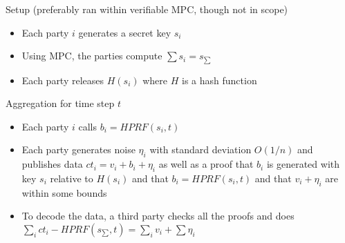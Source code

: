 \documentclass[11pt]{article}
\begin{document}
\begin{mdframed}
	Setup (preferably ran within verifiable MPC, though not in scope) \begin{itemize}
		\item Each party $i$ generates a secret key $s_i$
		\item Using MPC, the parties compute $\sum s_i = s_{\sum}$
		\item Each party releases $H(s_i)$ where $H$ is a hash function
	\end{itemize}
	Aggregation for time step $t$ \begin{itemize}
		\item Each party $i$ calls $b_i = HPRF(s_i, t)$ 
		\item Each party generates noise $\eta_i$ with standard deviation $O(1/n)$ and publishes data $ct_i = v_i + b_i + \eta_i$ as well as a proof that $b_i$ is generated with key $s_i$ relative to $H(s_i)$ and that $b_i = HPRF(s_i, t)$ and that $v_i + \eta_i$ are within some bounds
		\item To decode the data, a third party checks all the proofs and does $\sum_i ct_i - HPRF(s_{\sum}, t) = \sum_i v_i + \sum \eta_i$
	\end{itemize}
	\label{fig:prot}
\end{mdframed}



\end{document}
